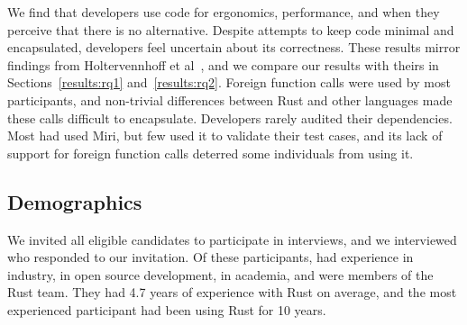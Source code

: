 We find that developers use \unsafe code for ergonomics, performance, and when they perceive that there is no alternative. Despite attempts to keep \unsafe code minimal and encapsulated, developers feel uncertain about its correctness. These results mirror findings from Holtervennhoff et al~\cite{holtervennhoff23}, and we compare our results with theirs in Sections~\ref{results:rq1} and~\ref{results:rq2}. Foreign function calls were used by most participants, and non-trivial differences between Rust and other languages made these calls difficult to encapsulate. Developers rarely audited their dependencies. Most had used Miri, but few used it to validate their test cases, and its lack of support for foreign function calls deterred some individuals from using it.

\subsection{Demographics} We invited all  eligible candidates to participate in interviews, and we interviewed  who responded to our invitation. Of these participants,  had experience in industry,  in open source development,  in academia, and  were members of the Rust team. They had 4.7 years of experience with Rust on average, and the most experienced participant had been using Rust for 10 years. 


